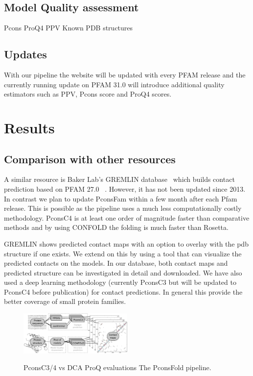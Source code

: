 \documentclass[a4,center,fleqn]{NAR}
\begin{document}
\subsection{Model Quality assessment}
Pcons
ProQ4
PPV
Known PDB structures

\subsection{Updates}

With our pipeline the website will be updated with every PFAM release
and the currently running update on PFAM 31.0 will introduce
additional quality estimators such as PPV, Pcons score and ProQ4
scores. 

\section{Results}

\subsection{Comparison with other resources}

A similar resource is Baker Lab’s GREMLIN database~\cite{Kamisetty2013} which builds contact prediction based on
PFAM 27.0~\cite{Sonnhammer:1997} . However, it has not been updated since
2013. In contrast we plan to update PconsFam within a few month after
each Pfam release. This is possible as the pipeline uses a much less
computationally costly methodology. PconsC4 is at least one order of
magnitude faster than comparative methods and by using CONFOLD the
folding is much faster than Rosetta.


GREMLIN shows predicted contact maps with an option to overlay with
the pdb structure if one exists. We extend on this by using a tool
that can visualize the predicted contacts on the models. In our
database, both contact maps and predicted structure can be
investigated in detail and downloaded.  We have also used a deep
learning methodology (currently PconsC3 but will be updated to PconsC4
before publication) for contact predictions. In general this provide
the better coverage of small protein families.




\begin{figure}[t]
\begin{center}
\end{center}
\caption{PconsC3/4 vs DCA
ProQ evaluations 
The PconsFold pipeline.}
    \includegraphics[width=0.5\textwidth]{figures/flowchart.eps}
\label{fig:Pipeline}
\end{figure}
\end{document}
